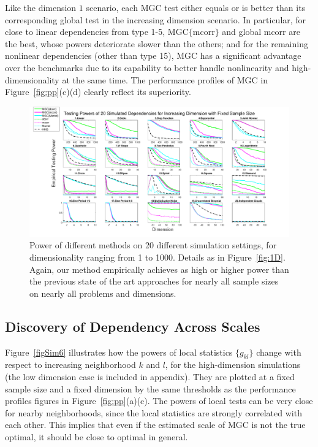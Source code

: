 \documentclass[11pt]{article}
\begin{document}
Like the dimension $1$ scenario, each MGC test either equals or is better than its corresponding global test in the increasing dimension scenario. In particular, for close to linear dependencies from type 1-5, MGC$\{$mcorr$\}$ and global mcorr are the best, whose powers deteriorate slower than the others; and for the remaining nonlinear dependencies (other than type 15), MGC has a significant advantage over the benchmarks due to its capability to better handle nonlinearity and high-dimensionality at the same time. The performance profiles of MGC in Figure~\ref{fig:pp}(c)(d) clearly reflect its superiority.

\begin{figure}[htbp]
\includegraphics[width=1.0\textwidth]{../Figures/Fig5}
\caption{Power of different methods on 20 different simulation settings, for dimensionality ranging from 1 to 1000.  Details as in Figure~\ref{fig:1D}.
Again, our method empirically achieves as high or higher power than the previous state of the art approaches for nearly all sample sizes on nearly all problems and dimensions.
}
\label{fig:nD}
\end{figure}

\subsection{Discovery of Dependency Across Scales}
\label{main3}

Figure~\ref{figSim6} illustrates how the powers of local statistics $\{g_{kl}\}$ change with respect to increasing neighborhood $k$ and $l$, for the high-dimension simulations (the low dimension case is included in appendix). They are plotted at a fixed sample size and a fixed dimension by the same thresholds as the performance profiles figures in Figure~\ref{fig:pp}(a)(c). The powers of local tests can be very close for nearby neighborhoods, since the local statistics are strongly correlated with each other. This implies that even if the estimated scale of MGC is not the true optimal, it should be close to optimal in general.
\end{document}
